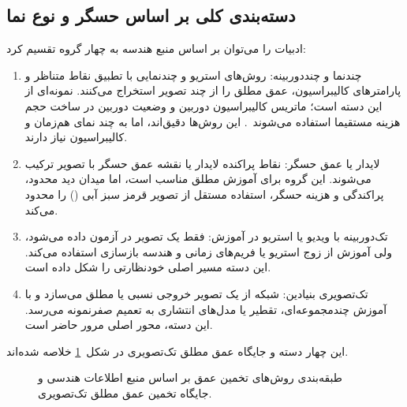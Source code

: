 \subsection{دسته‌بندی کلی بر اساس حسگر و نوع نما}
ادبیات را می‌توان بر اساس منبع هندسه به چهار گروه تقسیم کرد:
\begin{enumerate}
 \item چندنما و چنددوربینه: روش‌های استریو و چندنمایی با تطبیق نقاط متناظر و پارامترهای کالیبراسیون، عمق مطلق را از چند تصویر استخراج می‌کنند.  نمونه‌ای از این دسته است؛ ماتریس کالیبراسیون دوربین و وضعیت دوربین در ساخت حجم هزینه مستقیما استفاده می‌شوند~\cite{Yao2018MVSNet}. این روش‌ها دقیق‌اند، اما به چند نمای هم‌زمان و کالیبراسیون نیاز دارند.
 \item لایدار یا عمق حسگر: نقاط پراکنده لایدار یا نقشه عمق حسگر  با تصویر ترکیب می‌شوند. این گروه برای آموزش مطلق مناسب است، اما میدان دید محدود، پراکندگی و هزینه حسگر، استفاده مستقل از تصویر قرمز سبز آبی () را محدود می‌کند.
 \item تک‌دوربینه با ویدیو یا استریو در آموزش: فقط یک تصویر در آزمون داده می‌شود، ولی آموزش از زوج استریو یا فریم‌های زمانی و هندسه بازسازی استفاده می‌کند. این دسته مسیر اصلی خودنظارتی را شکل داده است.
 \item تک‌تصویری بنیادین: شبکه از یک تصویر  خروجی نسبی یا مطلق می‌سازد و با آموزش چندمجموعه‌ای، تقطیر یا مدل‌های انتشاری به تعمیم صفرنمونه می‌رسد. این دسته، محور اصلی مرور حاضر است.
\end{enumerate}

این چهار دسته و جایگاه عمق مطلق تک‌تصویری در شکل~\ref{fig:ch2_taxonomy} خلاصه شده‌اند.

\begin{figure}[htbp]
\centering
{}
\caption[دسته‌بندی روش‌های تخمین عمق]{طبقه‌بندی روش‌های تخمین عمق بر اساس منبع اطلاعات هندسی و جایگاه تخمین عمق مطلق تک‌تصویری.}
\label{fig:ch2_taxonomy}
\end{figure}

